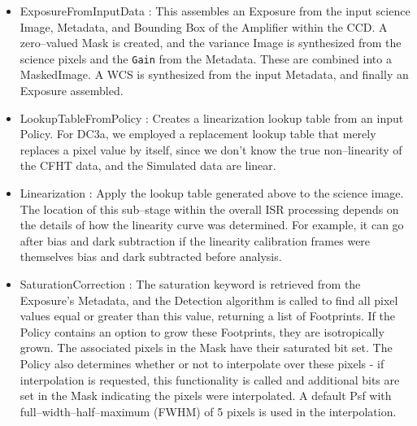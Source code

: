 \begin{itemize}

\item ExposureFromInputData : This assembles an Exposure from the
input science Image, Metadata, and Bounding Box of the Amplifier
within the CCD.  A zero--valued Mask is created, and the variance
Image is synthesized from the science pixels and the {\tt Gain} from
the Metadata.  These are combined into a MaskedImage.  A WCS is
synthesized from the input Metadata, and finally an Exposure assembled.

\item LookupTableFromPolicy : Creates a linearization lookup table
from an input Policy.
For DC3a, we employed a replacement lookup table that
merely replaces a pixel value by itself, since we don't know the true
non--linearity of the CFHT data, and the Simulated data are linear.

\item Linearization : Apply the lookup table generated above to the
science image.  The location of this sub--stage within the overall ISR
processing depends on the details of how the linearity curve was
determined.  For example, it can go after bias and dark subtraction
if the linearity calibration frames were themselves bias and dark
subtracted before analysis.

\item SaturationCorrection : The saturation keyword is retrieved from
the Exposure's Metadata, and the Detection algorithm is called to find
all pixel values equal or greater than this value, returning a list of
Footprints.  If the Policy contains an option to grow these
Footprints, they are isotropically grown.  The associated pixels in
the Mask have their saturated bit set.  The Policy also determines
whether or not to interpolate over these pixels - if interpolation is
requested, this functionality is called and additional bits are set in
the Mask indicating the pixels were interpolated.  A default Psf with
full--width--half--maximum (FWHM) of 5 pixels is used in the
interpolation.


\end{itemize}
